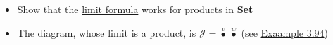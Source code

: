\begin{itemize}
    \item  Show that the \hyperref[P3.95]{limit formula} works for products in \textbf{Set}
    \item The diagram, whose limit is a product, is $\mathcal{J}=\boxed{\overset{v}\bullet\ \overset{w}\bullet}$ (see \hyperref[X3.94]{Exaample 3.94})
  \end{itemize}